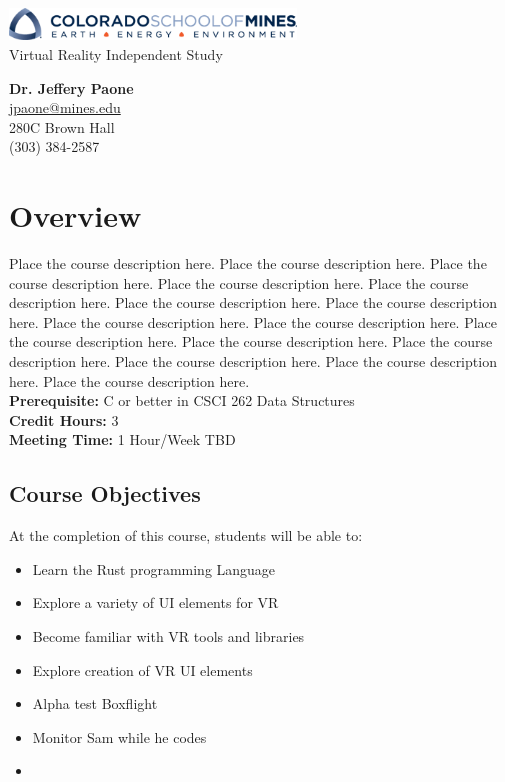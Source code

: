 \documentclass[11pt]{article}
\begin{document}
\begin{center}
    \includegraphics[width=3in]{logo-mines.png}
    \vspace{10mm}\\
    \LARGE Virtual Reality Independent Study
    \vspace{10mm}
\end{center}

\textbf{Dr. Jeffery Paone} \\
\url{jpaone@mines.edu} \\
280C Brown Hall \\
(303) 384-2587

\section{Overview}

Place the course description here. Place the course description here. Place the
course description here. Place the course description here. Place the course
description here. Place the course description here. Place the course
description here. Place the course description here. Place the course
description here. Place the course description here. Place the course
description here. Place the course description here. Place the course
description here. Place the course description here. Place the course
description here. \\

\textbf{Prerequisite:} C or better in CSCI 262 Data Structures \\
\textbf{Credit Hours:} 3 \\
\textbf{Meeting Time:} 1 Hour/Week TBD

\subsection{Course Objectives}
At the completion of this course, students will be able to:
\begin{itemize} \itemsep-0.4em
    \item Learn the Rust programming Language
    \item Explore a variety of UI elements for VR
    \item Become familiar with VR tools and libraries
    \item Explore creation of VR UI elements
    \item Alpha test Boxflight
    \item Monitor Sam while he codes
    \item 
\end{itemize}
\end{document}
